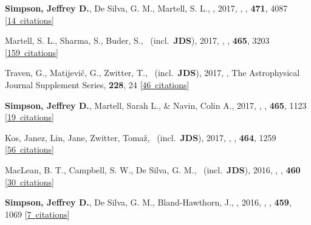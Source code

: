 \item[{\color{numcolor}\scriptsize11}] \textbf{Simpson, Jeffrey D.}, De Silva, G. M., Martell, S. L., \etal, 2017, , \mnras, \textbf{471}, 4087 [\href{https://ui.adsabs.harvard.edu/#abs/2017MNRAS.471.4087S}{14~citations}]

\item[{\color{numcolor}\scriptsize10}] Martell, S. L., Sharma, S., Buder, S., \etal\ (incl.\ \textbf{JDS}), 2017, , \mnras, \textbf{465}, 3203 [\href{https://ui.adsabs.harvard.edu/#abs/2017MNRAS.465.3203M}{159~citations}]

\item[{\color{numcolor}\scriptsize9}] Traven, G., Matijevi{\v{c}}, G., Zwitter, T., \etal\ (incl.\ \textbf{JDS}), 2017, , The Astrophysical Journal Supplement Series, \textbf{228}, 24 [\href{https://ui.adsabs.harvard.edu/#abs/2017ApJS..228...24T}{46~citations}]

\item[{\color{numcolor}\scriptsize8}] \textbf{Simpson, Jeffrey D.}, Martell, Sarah L., \& Navin, Colin A., 2017, , \mnras, \textbf{465}, 1123 [\href{https://ui.adsabs.harvard.edu/#abs/2017MNRAS.465.1123S}{19~citations}]

\item[{\color{numcolor}\scriptsize7}] Kos, Janez, Lin, Jane, Zwitter, Toma{\v{z}}, \etal\ (incl.\ \textbf{JDS}), 2017, , \mnras, \textbf{464}, 1259 [\href{https://ui.adsabs.harvard.edu/#abs/2017MNRAS.464.1259K}{56~citations}]

\item[{\color{numcolor}\scriptsize6}] MacLean, B. T., Campbell, S. W., De Silva, G. M., \etal\ (incl.\ \textbf{JDS}), 2016, , \mnras, \textbf{460} [\href{https://ui.adsabs.harvard.edu/#abs/2016MNRAS.460L..69M}{30~citations}]

\item[{\color{numcolor}\scriptsize5}] \textbf{Simpson, Jeffrey D.}, De Silva, G. M., Bland-Hawthorn, J., \etal, 2016, , \mnras, \textbf{459}, 1069 [\href{https://ui.adsabs.harvard.edu/#abs/2016MNRAS.459.1069S}{7~citations}]

